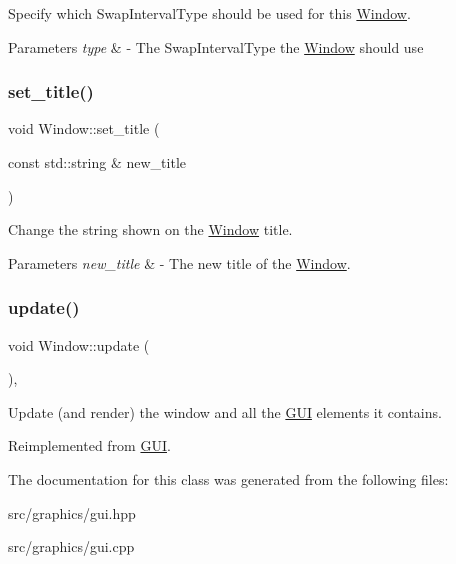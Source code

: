 Specify which Swap\+Interval\+Type should be used for this \mbox{\hyperlink{class_window}{Window}}. 
\begin{DoxyParams}{Parameters}
{\em type} & -\/ The Swap\+Interval\+Type the \mbox{\hyperlink{class_window}{Window}} should use \\
\hline
\end{DoxyParams}
\mbox{\label{class_window_a56c2030999233ae438cb86229bbf1fa8}} 
\subsubsection{\texorpdfstring{set\+\_\+title()}{set\_title()}}
{\footnotesize\ttfamily void Window\+::set\+\_\+title (\begin{DoxyParamCaption}\item[{const std\+::string \&}]{new\+\_\+title }\end{DoxyParamCaption})}

Change the string shown on the \mbox{\hyperlink{class_window}{Window}} title. 
\begin{DoxyParams}{Parameters}
{\em new\+\_\+title} & -\/ The new title of the \mbox{\hyperlink{class_window}{Window}}. \\
\hline
\end{DoxyParams}
\mbox{\label{class_window_aa63a9a2404cebe562174a851f2dc8a01}} 
\subsubsection{\texorpdfstring{update()}{update()}}
{\footnotesize\ttfamily void Window\+::update (\begin{DoxyParamCaption}{ }\end{DoxyParamCaption})\hspace{0.3cm}{\ttfamily [override]}, {\ttfamily [virtual]}}

Update (and render) the window and all the \mbox{\hyperlink{class_g_u_i}{G\+UI}} elements it contains. 

Reimplemented from \mbox{\hyperlink{class_g_u_i_a947e568bf884a8798e3e368417f662c7}{G\+UI}}.



The documentation for this class was generated from the following files\+:\begin{DoxyCompactItemize}
\item 
src/graphics/gui.\+hpp\item 
src/graphics/gui.\+cpp\end{DoxyCompactItemize}
